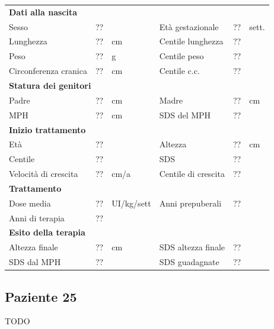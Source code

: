 \begin{table}[!h]
\begin{tabular}{lrllrl}
\toprule
\multicolumn{6}{l}{\textbf{Dati alla nascita}}\\
Sesso 		& \multicolumn{2}{l}{??} 	& Età gestazionale 		& ?? 		& sett.\\
Lunghezza 	& ?? 		& cm 				& Centile lunghezza		& ?? 		\\
Peso 		& ?? 		& g					& Centile peso			& ?? 		\\
Circonferenza cranica	& ?? 		& cm 	& Centile c.c.			& ?? \\
\midrule
\multicolumn{6}{l}{\textbf{Statura dei genitori}}\\
Padre 		& ?? & cm 	& Madre 				& ?? & cm \\
MPH 		& ?? & cm 	& SDS del MPH 			& ??\\
\midrule
\multicolumn{6}{l}{\textbf{Inizio trattamento}} \\
Età	& ?? & 		& Altezza 				& ?? & cm  \\
Centile & ?? 	 &		& SDS		& ?? \\
Velocità di crescita & ?? & cm/a	& Centile di crescita & ??\\
\midrule
\multicolumn{6}{l}{\textbf{Trattamento}} \\
Dose media		& ?? & UI/kg/sett & Anni prepuberali & ??\\
Anni di terapia & ??\\
\midrule
\multicolumn{6}{l}{\textbf{Esito della terapia}} \\
Altezza finale			& ?? & cm 	& SDS altezza finale		& ??\\
SDS dal MPH				& ?? &		& SDS guadagnate 			& ??\\
\bottomrule
\end{tabular}
\end{table}
\clearpage


\subsection*{Paziente 25}

TODO

